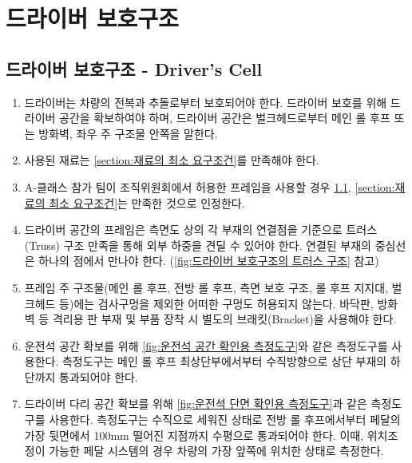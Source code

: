\documentclass[final,a4paper,10pt]{report}
\begin{document}
\chapter{드라이버 보호구조}

\section{드라이버 보호구조 - Driver’s Cell} \label{section:드라이버 보호구조}
\begin{enumerate}
  \item 드라이버는 차량의 전복과 추돌로부터 보호되어야 한다. 드라이버 보호를 위해 드라이버 공간을 확보하여야 하며, 드라이버 공간은 벌크헤드로부터 메인 롤 후프 또는 방화벽, 좌우 주 구조물 안쪽을 말한다.
  \item 사용된 재료는 \cref{section:재료의 최소 요구조건}를 만족해야 한다.
  \item A-클래스 참가 팀이 조직위원회에서 허용한 프레임을 사용할 경우 \cref{section:드라이버 보호구조}, \cref{section:재료의 최소 요구조건}는 만족한 것으로 인정한다.
  
  
  \item 드라이버 공간의 프레임은 측면도 상의 각 부재의 연결점을 기준으로 트러스(Truss) 구조 만족을 통해 외부 하중을 견딜 수 있어야 한다. 연결된 부재의 중심선은 하나의 점에서 만나야 한다. (\cref{fig:드라이버 보호구조의 트러스 구조} 참고)
  
  
  \item 프레임 주 구조물(메인 롤 후프, 전방 롤 후프, 측면 보호 구조, 롤 후프 지지대, 벌크헤드 등)에는 검사구멍을 제외한 어떠한 구멍도 허용되지 않는다. 바닥판, 방화벽 등 격리용 판 부재 및 부품 장착 시 별도의 브래킷(Bracket)을 사용해야 한다.
  \item 운전석 공간 확보를 위해 \cref{fig:운전석 공간 확인용 측정도구}와 같은 측정도구를 사용한다. 측정도구는 메인 롤 후프 최상단부에서부터 수직방향으로 상단 부재의 하단까지 통과되어야 한다.
  
  
  \item 드라이버 다리 공간 확보를 위해 \cref{fig:운전석 단면 확인용 측정도구}과 같은 측정도구를 사용한다. 측정도구는 수직으로 세워진 상태로 전방 롤 후프에서부터 페달의 가장 뒷면에서 100mm 떨어진 지점까지 수평으로 통과되어야 한다. 이때, 위치조정이 가능한 페달 시스템의 경우 차량의 가장 앞쪽에 위치한 상태로 측정한다.
  
\end{enumerate}
\end{document}

